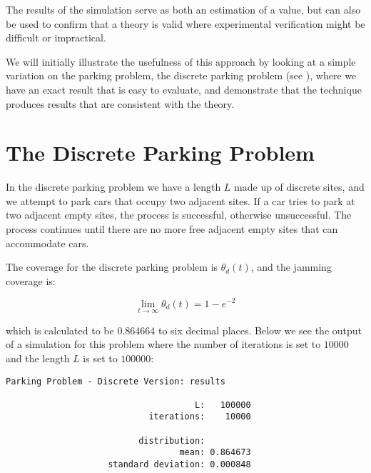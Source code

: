 The results of the simulation serve as both an estimation 
of a value, but can also be used to confirm that a theory 
is valid where experimental verification might be 
difficult or impractical. \bigskip

We will initially illustrate the usefulness of this approach  
by looking at a simple variation on the parking problem, the 
discrete parking problem (see \cite{krapivsky2010kinetic}), 
where we have an exact result that is easy to evaluate, and 
demonstrate that the technique produces results that are 
consistent with the theory. \bigskip

\newpage






\section{The Discrete Parking Problem}

In the discrete parking problem we have a length $L$ 
made up of discrete sites, and we attempt to park cars 
that occupy two adjacent sites. If a car tries to park 
at two adjacent empty sites, the process is successful, 
otherwise unsuccessful. The process continues until 
there are no more free adjacent empty sites that can 
accommodate cars. \bigskip

The coverage for the discrete parking 
problem is $\theta_{d}(t)$, and the jamming coverage is: \bigskip

\[
	\lim_{t \to \infty} \theta_{d}(t) = 1 - e^{-2}
\]\medskip

which is calculated to be $0.864664$ to six decimal 
places. Below we see the output of a simulation for this problem 
where the number of iterations is set to $10000$ and the 
length $L$ is set to $100000$: \bigskip

	\begin{lstlisting}[numbers=none]
    Parking Problem - Discrete Version: results

                                     L:   100000
                            iterations:    10000

                          distribution:
                                  mean: 0.864673
                    standard deviation: 0.000848

	\end{lstlisting} \bigskip

